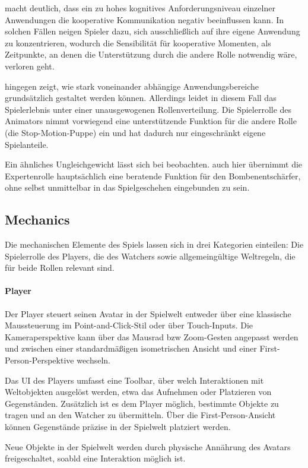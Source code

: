  macht deutlich, dass ein zu hohes kognitives Anforderungsniveau einzelner Anwendungen die kooperative Kommunikation negativ beeinflussen kann. In solchen Fällen neigen Spieler dazu, sich ausschließlich auf ihre eigene Anwendung zu konzentrieren, wodurch die Sensibilität für kooperative Momenten, als Zeitpunkte, an denen die Unterstützung durch die andere Rolle notwendig wäre, verloren geht.

 hingegen zeigt, wie stark voneinander abhängige Anwendungsbereiche grundsätzlich gestaltet werden können. Allerdings leidet in diesem Fall das Spielerlebnis unter einer unausgewogenen Rollenverteilung. Die Spielerrolle des Animators nimmt vorwiegend eine unterstützende Funktion für die andere Rolle (die Stop-Motion-Puppe) ein und hat dadurch nur eingeschränkt eigene Spielanteile.

Ein ähnliches Ungleichgewicht lässt sich bei  beobachten. auch hier übernimmt die Expertenrolle hauptsächlich eine beratende Funktion für den Bombenentschärfer, ohne selbst unmittelbar in das Spielgeschehen eingebunden zu sein.

\subsection{Mechanics}
Die mechanischen Elemente des Spiels lassen sich in drei Kategorien einteilen: Die Spielerrolle des Players, die des Watchers sowie allgemeingültige Weltregeln, die für beide Rollen relevant sind.

\paragraph{Player}

Der Player steuert seinen Avatar in der Spielwelt entweder über eine klassische Maussteuerung im Point-and-Click-Stil oder über Touch-Inputs. Die Kameraperspektive kann über das Mausrad bzw Zoom-Gesten angepasst werden und zwischen einer standardmäßigen isometrischen Ansicht und einer First-Person-Perspektive wechseln.

Das \ac{UI} des Players umfasst eine Toolbar, über welch Interaktionen mit Weltobjekten ausgelöst werden, etwa das Aufnehmen oder Platzieren von Gegenständen. Zusätzlich ist es dem Player möglich, bestimmte Objekte zu tragen und an den Watcher zu übermitteln. Über die First-Person-Ansicht können Gegenstände präzise in der Spielwelt platziert werden.

Neue Objekte in der Spielwelt werden durch physische Annährung des Avatars freigeschaltet, soabld eine Interaktion möglich ist.

